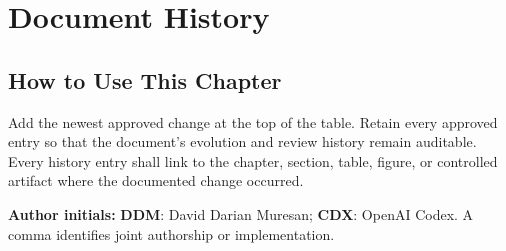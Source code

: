 \chapter*{Document History}
\section*{How to Use This Chapter}
Add the newest approved change at the top of the table. Retain every approved
entry so that the document's evolution and review history remain auditable.
Every history entry shall link to the chapter, section, table, figure, or
controlled artifact where the documented change occurred.

\noindent\textbf{Author initials:} \textbf{DDM}: David Darian Muresan;
\textbf{CDX}: OpenAI Codex. A comma identifies joint authorship or implementation.

